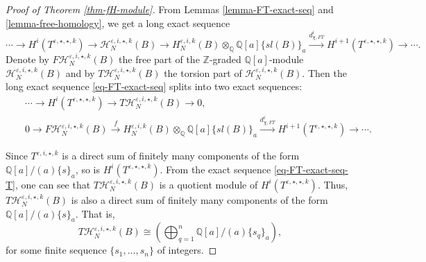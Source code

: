 \documentclass{amsart}
\theoremstyle{plain}
\theoremstyle{definition}
\theoremstyle{remark}
\numberwithin{equation}{section}
\begin{document}
\begin{proof}[Proof of Theorem \ref{thm-fH-module}]
From Lemmas \ref{lemma-FT-exact-seq} and \ref{lemma-free-homology}, we get a long exact sequence 
\begin{equation}\label{eq-FT-exact-seq}
\cdots \rightarrow H^i(T^{{\varepsilon},\star,\star,k}) \rightarrow {\mathcal{H}}_N^{{\varepsilon},i,\star,k}(B) \rightarrow H_N^{{\varepsilon},i,k}(B)\otimes_{\mathbb{Q}} {\mathbb{Q}}[a]\{sl(B)\}_a \xrightarrow{d_{\chi,FT}^{i}} H^{i+1}(T^{{\varepsilon},\star,\star,k}) \rightarrow \cdots.
\end{equation}
Denote by $F{\mathcal{H}}_N^{{\varepsilon},i,\star,k}(B)$ the free part of the ${\mathbb{Z}}$-graded ${\mathbb{Q}}[a]$-module ${\mathcal{H}}_N^{{\varepsilon},i,\star,k}(B)$ and by $T{\mathcal{H}}_N^{{\varepsilon},i,\star,k}(B)$ the torsion part of ${\mathcal{H}}_N^{{\varepsilon},i,\star,k}(B)$. Then the long exact sequence \eqref{eq-FT-exact-seq} splits into two exact sequences:
\begin{eqnarray}
\label{eq-FT-exact-seq-T} && \cdots \rightarrow H^i(T^{{\varepsilon},\star,\star,k}) \rightarrow T{\mathcal{H}}_N^{{\varepsilon},i,\star,k}(B) \rightarrow 0, \\
\label{eq-FT-exact-seq-F} && 0 \rightarrow F{\mathcal{H}}_N^{{\varepsilon},i,\star,k}(B) \xrightarrow{f} H_N^{{\varepsilon},i,k}(B)\otimes_{\mathbb{Q}} {\mathbb{Q}}[a]\{sl(B)\}_a \xrightarrow{d_{\chi,FT}^{i}} H^{i+1}(T^{{\varepsilon},\star,\star,k}) \rightarrow \cdots.
\end{eqnarray}

Since $T^{{\varepsilon},i,\star,k}$ is a direct sum of finitely many components of the form ${\mathbb{Q}}[a]/(a)\{s\}_a$, so is $H^i(T^{{\varepsilon},\star,\star,k})$. From the exact sequence \eqref{eq-FT-exact-seq-T}, one can see that $T{\mathcal{H}}_N^{{\varepsilon},i,\star,k}(B)$ is a quotient module of $ H^i(T^{{\varepsilon},\star,\star,k})$. Thus, $T{\mathcal{H}}_N^{{\varepsilon},i,\star,k}(B)$ is also a direct sum of finitely many components of the form ${\mathbb{Q}}[a]/(a)\{s\}_a$. That is, 
\begin{equation}\label{eq-fH-module-tor}
T{\mathcal{H}}_N^{{\varepsilon},i,\star,k}(B) \cong (\bigoplus_{q=1}^{n} {\mathbb{Q}}[a]/(a)\{s_q\}_a),
\end{equation}
for some finite sequence $\{s_1,\dots,s_n\}$ of integers.


\end{proof}
\end{document}
